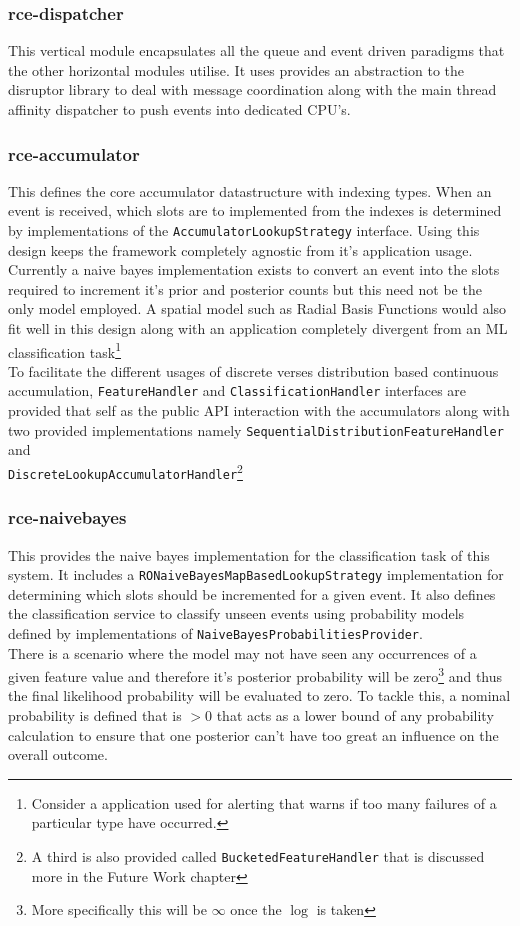 \documentclass[a4paper,11pt]{scrreprt}
\begin{document}
\subsubsection{rce-dispatcher}
This vertical module encapsulates all the queue and event driven paradigms that the other horizontal modules utilise. It uses provides an abstraction to the disruptor library to deal with message coordination along with the main thread affinity dispatcher to push events into dedicated CPU's.

\subsubsection{rce-accumulator}
This defines the core accumulator datastructure with indexing types. When an event is received, which slots are to implemented from the indexes is determined by implementations of the \verb|AccumulatorLookupStrategy| interface. Using this design keeps the framework completely agnostic from it's application usage. Currently a naive bayes implementation exists to convert an event into the slots required to increment it's prior and posterior counts but this need not be the only model employed. A spatial model such as Radial Basis Functions would also fit well in this design along with an application completely divergent from an ML classification task\footnote{Consider a application used for alerting that warns if too many failures of a particular type have occurred.}\\
To facilitate the different usages of discrete verses distribution based continuous accumulation, \verb|FeatureHandler| and \verb|ClassificationHandler| interfaces are provided that self as the public API interaction with the accumulators along with two provided implementations namely \verb|SequentialDistributionFeatureHandler| and\\ \verb|DiscreteLookupAccumulatorHandler|\footnote{A third is also provided called \verb|BucketedFeatureHandler| that is discussed more in the Future Work chapter}

\subsubsection{rce-naivebayes}
This provides the naive bayes implementation for the classification task of this system. It includes a \verb|RONaiveBayesMapBasedLookupStrategy| implementation for determining which slots should be incremented for a given event. It also defines the classification service to classify unseen events using probability models defined by implementations of \verb|NaiveBayesProbabilitiesProvider|. \\There is a scenario where the model may not have seen any occurrences of a given feature value and therefore it's posterior probability will be zero\footnote{More specifically this will be \(\infty\) once the \(\log\) is taken} and thus the final likelihood probability will be evaluated to zero. To tackle this, a nominal probability is defined that is \(> 0\) that acts as a lower bound of any probability calculation to ensure that one posterior can't have too great an influence on the overall outcome.  
\end{document}
